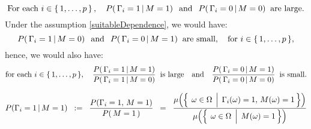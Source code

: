 \begin{equation}
\textnormal{For each $i \in\left\{\,1,\ldots,p\,\right\}$}\,,
\quad
P(\,\Gamma_{i}=1\,\vert\,M = 1)\;\;\,\textnormal{and}\;\;\,P(\,\Gamma_{i}=0\,\vert\,M = 0)\;\;\textnormal{are large}.
\end{equation}
Under the assumption \eqref{suitableDependence}, we would have:
\begin{equation*}
P(\,\Gamma_{i}=1\,\vert\,M = 0)\;\;\,\textnormal{and}\;\;\,P(\,\Gamma_{i}=0\,\vert\,M = 1)\;\;\textnormal{are small},
\quad
\textnormal{for $i \in\left\{\,1,\ldots,p\,\right\}$},
\end{equation*}
hence, we would also have:
\begin{equation*}
\textnormal{for each $i \in\left\{\,1,\ldots,p\,\right\}$},
\quad
\dfrac{P(\,\Gamma_{i}=1\,\vert\,M = 1)}{P(\,\Gamma_{i}=1\,\vert\,M = 0)}\;\;\textnormal{is large}
\quad\textnormal{and}\quad
\dfrac{P(\,\Gamma_{i}=0\,\vert\,M = 1)}{P(\,\Gamma_{i}=0\,\vert\,M = 0)}\;\;\textnormal{is small}.
\end{equation*}

\begin{equation*}
P\!\left(\Gamma_{i}=1\,\vert\,M=1\right)
\;\; := \;\;
	\dfrac{P\!\left(\Gamma_{i}=1,\,M=1\right)}{P\!\left(\,M=1\,\right)}
\;\; = \;\;
	\dfrac{\mu\!\left(\left\{\;\left.\omega\overset{{\color{white}.}}{\in}\Omega\,\;\right\vert\;\Gamma_{i}(\omega)=1,\,M(\omega)=1\,\right\}\right)}
	{\mu\!\left(\left\{\;\left.\omega\overset{{\color{white}.}}{\in}\Omega\;\,\right\vert\;M(\omega)=1\,\right\}\right)}
\end{equation*}


\renewcommand{\theenumi}{\roman{enumi}}
\renewcommand{\labelenumi}{\textnormal{(\theenumi)}$\;\;$}

